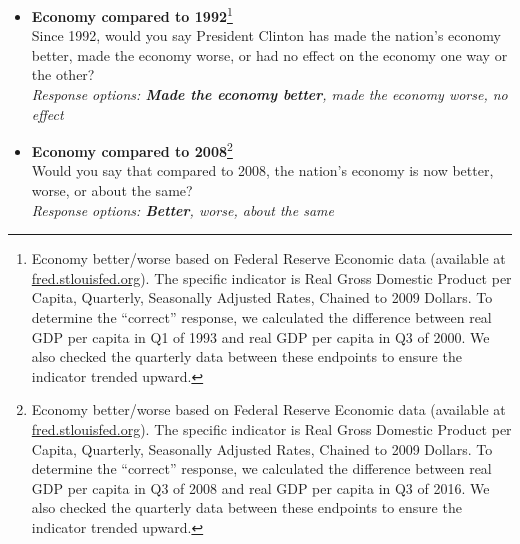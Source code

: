 \documentclass[12pt, letterpaper]{article}
\begin{document}
\large {}
\normalsize
\begin{itemize}
\item \textbf{Economy compared to 1992}\footnote{Economy better/worse based on Federal Reserve Economic data (available at \url{fred.stlouisfed.org}). The specific indicator is Real Gross Domestic Product per Capita, Quarterly, Seasonally Adjusted Rates, Chained to 2009 Dollars. To determine the ``correct'' response, we calculated the difference between real GDP per capita in Q1 of 1993 and real GDP per capita in Q3 of 2000. We also checked the quarterly data between these endpoints to ensure the indicator trended upward.} \\
Since 1992, would you say President Clinton has made the nation's economy better, made the economy worse, or had no effect on the economy one way or the other?        \\     
\textit{Response options: \textbf{Made the economy better}, made the economy worse, no effect} \\
\end{itemize}


\large {}

\normalsize
\begin{itemize}
\item \textbf{Economy compared to 2008}\footnote{Economy better/worse based on Federal Reserve Economic data (available at \url{fred.stlouisfed.org}). The specific indicator is Real Gross Domestic Product per Capita, Quarterly, Seasonally Adjusted Rates, Chained to 2009 Dollars. To determine the ``correct'' response, we calculated the difference between real GDP per capita in Q3 of 2008 and real GDP per capita in Q3 of 2016. We also checked the quarterly data between these endpoints to ensure the indicator trended upward.} \\
Would you say that compared to 2008, the nation's economy is now better, worse, or about the same?  \\     
\textit{Response options: \textbf{Better}, worse, about the same} \\
\end{itemize}

\clearpage



\clearpage
\end{document}
